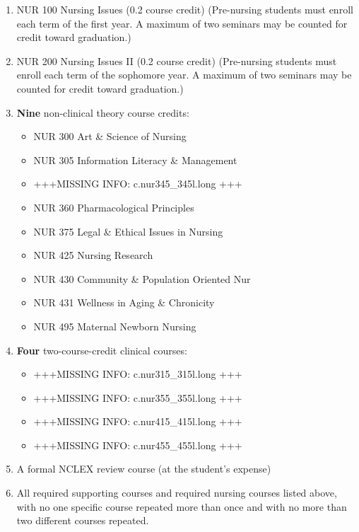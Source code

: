\documentclass[
  letterpaper,
]{scrbook}
\providecommand{\tightlist}{%
  \setlength{\itemsep}{0pt}\setlength{\parskip}{0pt}}
\begin{document}
\begin{enumerate}
\def\labelenumi{\arabic{enumi}.}
\setcounter{enumi}{2}
\item
  NUR 100 Nursing Issues (0.2 course credit) (Pre-nursing students must
  enroll each term of the first year. A maximum of two seminars may be
  counted for credit toward graduation.)
\item
  NUR 200 Nursing Issues II (0.2 course credit) (Pre-nursing students
  must enroll each term of the sophomore year. A maximum of two seminars
  may be counted for credit toward graduation.)
\item
  \textbf{Nine} non-clinical theory course credits:

  \begin{itemize}
  \tightlist
  \item
    NUR 300 Art \& Science of Nursing
  \item
    NUR 305 Information Literacy \& Management
  \item
    +++MISSING INFO: c.nur345\_345l.long +++
  \item
    NUR 360 Pharmacological Principles
  \item
    NUR 375 Legal \& Ethical Issues in Nursing
  \item
    NUR 425 Nursing Research
  \item
    NUR 430 Community \& Population Oriented Nur
  \item
    NUR 431 Wellness in Aging \& Chronicity
  \item
    NUR 495 Maternal Newborn Nursing
  \end{itemize}
\item
  \textbf{Four} two-course-credit clinical courses:

  \begin{itemize}
  \tightlist
  \item
    +++MISSING INFO: c.nur315\_315l.long +++
  \item
    +++MISSING INFO: c.nur355\_355l.long +++
  \item
    +++MISSING INFO: c.nur415\_415l.long +++
  \item
    +++MISSING INFO: c.nur455\_455l.long +++
  \end{itemize}
\item
  A formal NCLEX review course (at the student's expense)
\item
  All required supporting courses and required nursing courses listed
  above, with no one specific course repeated more than once and with no
  more than two different courses repeated.
\end{enumerate}
\end{document}
